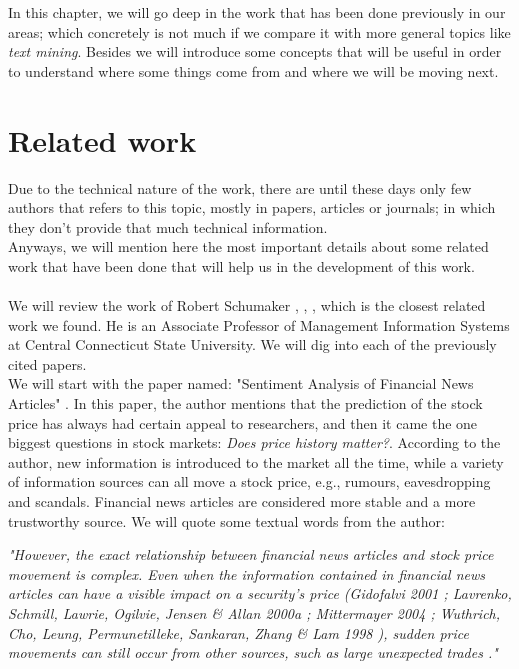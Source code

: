 
In this chapter, we will go deep in the work that has been done previously in our areas; which concretely is not much if we compare it with more general topics like \emph{text mining}. Besides we will introduce some concepts that will be useful in order to understand where some things come from and where we will be moving next. 


\section{Related work}\label{previousResults}

Due to the technical nature of the work, there are until these days only few authors that refers to this topic, mostly in papers, articles or journals; in which they don't provide that much technical information.\\
Anyways, we will mention here the most important details about some related work that have been done that will help us in the development of this work.\\\\
We will review the work of Robert Schumaker \cite{SCH2012}, \cite{SCH2010}, \cite{SCH2010-1}, which is the closest related work we found. He is an Associate Professor of Management Information Systems at Central Connecticut State University. We will dig into each of the previously cited papers.\\ We will start with the paper named: "Sentiment Analysis of Financial News Articles" \cite{SCH2012}. In this paper, the author mentions that the prediction of the stock price has always had certain appeal to researchers, and then it came the one biggest questions in stock markets:  \emph{Does price history matter?}. According to the author, new information is introduced to the market all the time, while a variety of information sources can all move a stock price, e.g., rumours, eavesdropping and scandals. Financial news articles are considered more stable and a more trustworthy source. We will quote some textual words from the author:

\emph{"However, the exact relationship between financial news articles and stock price movement is complex. Even when the information contained in financial news articles can have a visible impact on a security’s price (Gidofalvi 2001 \cite{GG2001}; Lavrenko, Schmill, Lawrie, Ogilvie, Jensen \& Allan 2000a \cite{LSL2001}; Mittermayer 2004 \cite{MM2004}; Wuthrich, Cho, Leung, Permunetilleke, Sankaran, Zhang \& Lam 1998 \cite{WC1998}), sudden price movements can still occur from other sources, such as large unexpected trades \cite{CW1991}."}

